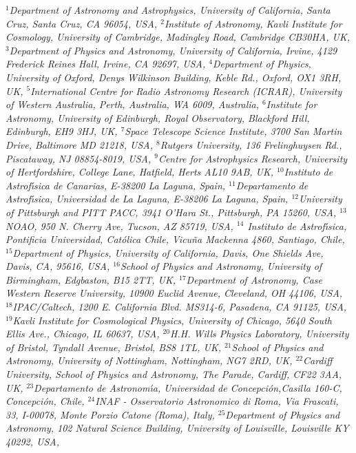 {\justify\it\small
$^{1}$Department of Astronomy and Astrophysics, University of California, Santa Cruz, Santa Cruz, CA 96054, USA,
$^{2}$Institute of Astronomy, Kavli Institute for Cosmology, University of Cambridge, Madingley Road, Cambridge CB30HA, UK,
$^{3}$Department of Physics and Astronomy, University of California, Irvine, 4129 Frederick Reines Hall, Irvine, CA 92697, USA,
$^{4}$Department of Physics, University of Oxford, Denys Wilkinson Building, Keble Rd., Oxford, OX1 3RH, UK,
$^{5}$International Centre for Radio Astronomy Research (ICRAR), University of Western Australia, Perth, Australia, WA 6009, Australia,
$^{6}$Institute for Astronomy, University of Edinburgh, Royal Observatory, Blackford Hill, Edinburgh, EH9 3HJ, UK,
$^{7}$Space Telescope Science Institute, 3700 San Martin Drive, Baltimore MD 21218, USA,
$^{8}$Rutgers University, 136 Frelinghuysen Rd., Piscataway, NJ 08854-8019, USA,
$^{9}$Centre for Astrophysics Research, University of Hertfordshire, College Lane, Hatfield, Herts AL10 9AB, UK,
$^{10}$Instituto de Astrof\'\i sica de Canarias, E-38200 La Laguna, Spain,
$^{11}$Departamento de Astrof\'\i sica, Universidad de La Laguna, E-38206 La Laguna, Spain,
$^{12}$University of Pittsburgh and PITT PACC, 3941 O{'}Hara St., Pittsburgh, PA 15260, USA,
$^{13}$NOAO, 950 N. Cherry Ave, Tucson, AZ 85719, USA,
$^{14}$ Instituto de Astrof\'\i sica, Pontificia Universidad,
Cat{\'{o}}lica Chile, Vicu{\~{n}}a Mackenna 4860, Santiago, Chile,
$^{15}$Department of Physics, University of California, Davis, One Shields Ave, Davis, CA, 95616, USA,
$^{16}$School of Physics and Astronomy, University of Birmingham, Edgbaston, B15 2TT, UK,
$^{17}$Department of Astronomy, Case Western Reserve University, 10900 Euclid Avenue, Cleveland, OH 44106, USA,
$^{18}$IPAC/Caltech, 1200 E. California Blvd. MS314-6, Pasadena, CA 91125, USA,
$^{19}$Kavli Institute for Cosmological Physics, University of Chicago, 5640 South Ellis Ave., Chicago, IL 60637, USA,
$^{20}$H.H. Wills Physics Laboratory, University of Bristol, Tyndall Avenue, Bristol, BS8 1TL, UK,
$^{21}$School of Physics and Astronomy, University of Nottingham, Nottingham, NG7 2RD, UK,
$^{22}$Cardiff University, School of Physics and Astronomy, The Parade, Cardiff, CF22 3AA, UK,
$^{23}$Departamento de Astronom\'\i a, Universidad de Concepci{\'{o}}n,Casilla 160-C, Concepci{\'{o}}n, Chile,
$^{24}$INAF - Osservatorio Astronomico di Roma, Via Frascati, 33, I-00078, Monte Porzio Catone (Roma), Italy,
$^{25}$Department of Physics and Astronomy, 102 Natural Science Building, University of Louisville, Louisville KY 40292, USA,
}
